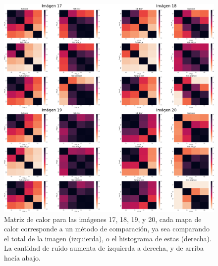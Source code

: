 \begin{figure}
    \centering
    \includegraphics[width=\textwidth]{figuras/heatmaps/heatmaps_app_4.png}
    \caption{Matriz de calor para las im\'agenes 17, 18, 19, y 20, cada mapa de calor corresponde a un m\'etodo de comparaci\'on, ya sea comparando el total de la imagen (izquierda), o el histograma de estas (derecha). La cantidad de ruido aumenta de izquierda a derecha, y de arriba hacía abajo.}
\end{figure}


